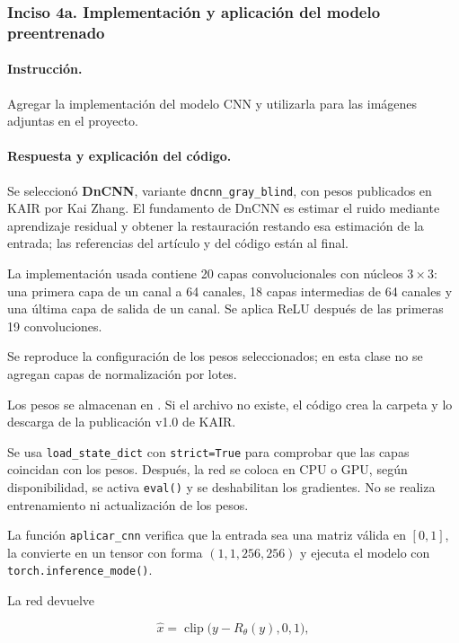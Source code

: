 \documentclass[11pt]{article}
\begin{document}
\subsubsection*{
    Inciso 4a. Implementación y aplicación del modelo preentrenado
}

\paragraph{Instrucción.}

Agregar la implementación del modelo CNN y utilizarla para
las imágenes adjuntas en el proyecto.

\paragraph{Respuesta y explicación del código.}

Se seleccionó \textbf{DnCNN}, variante
\texttt{dncnn\_gray\_blind}, con pesos publicados en KAIR por
Kai Zhang. El fundamento de DnCNN es estimar el ruido
mediante aprendizaje residual y obtener la restauración
restando esa estimación de la entrada; las referencias del
artículo y del código están al final.

La implementación usada contiene 20 capas convolucionales
con núcleos $3\times3$: una primera capa de un canal a
64 canales, 18 capas intermedias de 64 canales y una última
capa de salida de un canal. Se aplica ReLU después de las
primeras 19 convoluciones.

Se reproduce la configuración de los pesos seleccionados;
en esta clase no se agregan capas de normalización por lotes.

Los pesos se almacenan en
.
Si el archivo no existe, el código crea la carpeta y lo
descarga de la publicación v1.0 de KAIR.

Se usa \texttt{load\_state\_dict} con
\texttt{strict=True} para comprobar que las capas coincidan
con los pesos. Después, la red se coloca en CPU o GPU,
según disponibilidad, se activa \texttt{eval()} y se
deshabilitan los gradientes. No se realiza entrenamiento
ni actualización de los pesos.

La función \texttt{aplicar\_cnn} verifica que la entrada
sea una matriz válida en $[0,1]$, la convierte en un tensor
con forma $(1,1,256,256)$ y ejecuta el modelo con
\texttt{torch.inference\_mode()}.

La red devuelve

\begin{equation}
    \widehat{x}
    =
    \operatorname{clip}
    \bigl(y-R_{\theta}(y),0,1\bigr),
\end{equation}
\end{document}
